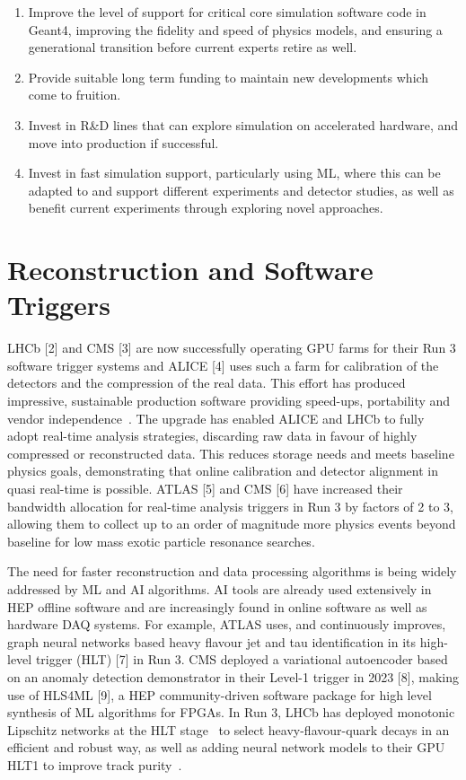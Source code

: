 \documentclass[10pt,a4paper]{article}
\begin{document}
\begin{enumerate}
\def\labelenumi{\arabic{enumi}.}
\item
  Improve the level of support for critical core simulation software code in
  Geant4, improving the fidelity and speed of physics models, and ensuring a
  generational transition before current experts retire as well.
\item
  Provide suitable long term funding to maintain new developments which
  come to fruition.
\item
  Invest in R\&D lines that can explore simulation on accelerated
  hardware, and move into production if successful.
\item
  Invest in fast simulation support, particularly using ML, where this
  can be adapted to and support different experiments and detector
  studies, as well as benefit current experiments through exploring
  novel approaches.
\end{enumerate}

\section{Reconstruction and Software
Triggers}\label{reconstruction-and-software-triggers}

LHCb {[}2{]} and CMS {[}3{]} are now successfully operating GPU farms for their
Run 3 software trigger systems and ALICE {[}4{]} uses such a farm for
calibration of the detectors and the compression of the real data. This
effort has produced impressive, sustainable production software providing
speed-ups, portability and vendor
independence~\cite{ALICE:vendorunlockedITS,LHb:Allen,MathesP3MA2017}. The
upgrade has enabled ALICE and LHCb to fully adopt real-time analysis strategies,
discarding raw data in favour of highly compressed or reconstructed
data. This reduces storage needs and meets baseline physics goals, demonstrating that
online calibration and detector alignment in quasi real-time is possible. ATLAS
{[}5{]} and CMS {[}6{]} have increased their bandwidth allocation for real-time
analysis triggers in Run 3 by factors of 2 to 3, allowing them to
collect up to an order of magnitude more physics events beyond
baseline for low mass exotic particle resonance searches.

The need for faster reconstruction and data processing algorithms is being
widely addressed by ML and AI algorithms. AI tools are already used extensively
in HEP offline software and are increasingly found in online software as well as
hardware DAQ systems. For example, ATLAS uses, and continuously improves, graph
neural networks based heavy flavour jet and tau identification in its high-level
trigger (HLT) {[}7{]} in Run 3. CMS deployed a variational autoencoder based on
an anomaly detection demonstrator in their Level-1 trigger in 2023 {[}8{]},
making use of HLS4ML {[}9{]}, a HEP community-driven
software package for high level synthesis of ML algorithms for FPGAs. In Run 3,
LHCb has deployed monotonic Lipschitz networks at the HLT
stage~\cite{LHCb:Lipschitz} to select heavy-flavour-quark decays in an efficient
and robust way, as well as adding neural network models to their GPU HLT1 to
improve track purity~\cite{neuralmodelHLT1LHCb}.
\end{document}
